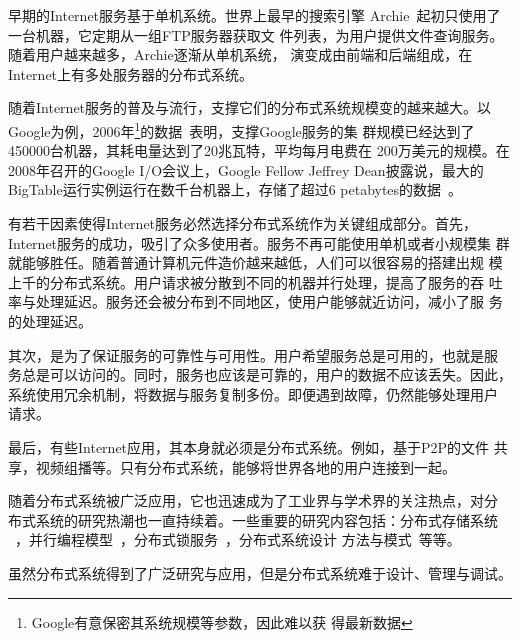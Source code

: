 早期的Internet服务基于单机系统。世界上最早的搜索引擎
Archie~\cite{archie}起初只使用了一台机器，它定期从一组FTP服务器获取文
件列表，为用户提供文件查询服务。随着用户越来越多，Archie逐渐从单机系统，
演变成由前端和后端组成，在Internet上有多处服务器的分布式系统。

随着Internet服务的普及与流行，支撑它们的分布式系统规模变的越来越大。以
Google为例，2006年\footnote{Google有意保密其系统规模等参数，因此难以获
得最新数据}的数据~\cite{how_google_works}表明，支撑Google服务的集
群规模已经达到了450000台机器，其耗电量达到了20兆瓦特，平均每月电费在
200万美元的规模。在2008年召开的Google I/O会议上，Google Fellow Jeffrey
Dean披露说，最大的BigTable运行实例运行在数千台机器上，存储了超过6
petabytes的数据~\cite{cnbeta_bigtable}。


有若干因素使得Internet服务必然选择分布式系统作为关键组成部分。首先，
Internet服务的成功，吸引了众多使用者。服务不再可能使用单机或者小规模集
群就能够胜任。随着普通计算机元件造价越来越低，人们可以很容易的搭建出规
模上千的分布式系统。用户请求被分散到不同的机器并行处理，提高了服务的吞
吐率与处理延迟。服务还会被分布到不同地区，使用户能够就近访问，减小了服
务的处理延迟。

其次，是为了保证服务的可靠性与可用性。用户希望服务总是可用的，也就是服
务总是可以访问的。同时，服务也应该是可靠的，用户的数据不应该丢失。因此，
系统使用冗余机制，将数据与服务复制多份。即便遇到故障，仍然能够处理用户
请求。

最后，有些Internet应用，其本身就必须是分布式系统。例如，基于P2P的文件
共享，视频组播等。只有分布式系统，能够将世界各地的用户连接到一起。


随着分布式系统被广泛应用，它也迅速成为了工业界与学术界的关注热点，对分
布式系统的研究热潮也一直持续着。一些重要的研究内容包括：分布式存储系统
~\cite{gfs, bigtable, dynamo, pacifica}，并行编程模型~\cite{mapreduce,
sawzall, dryad, dryadlinq}，分布式锁服务~\cite{chubby}，分布式系统设计
方法与模式~\cite{sinfonia, boxwood, seda, mace, macedon, p2}等等。



虽然分布式系统得到了广泛研究与应用，但是分布式系统难于设计、管理与调试。

